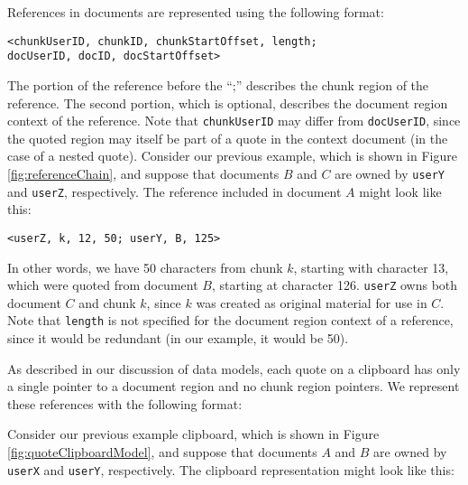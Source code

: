 \documentclass{acm_proc_article-sp}
\begin{document}
References in documents are represented using the following format:
\begin{center}
{\tt <chunkUserID, chunkID, chunkStartOffset, length;\\ 
docUserID, docID, docStartOffset>} 
\end{center}
The portion of the reference before the ``;'' describes the chunk region of the reference.  
The second portion, which is optional, describes the document region context of the reference.  
Note that {\tt chunkUserID} may differ from {\tt docUserID}, since the quoted region may itself be part of a quote in the context document (in the case of a nested quote).
Consider our previous example, which is shown in Figure \ref{fig:referenceChain}, and suppose that documents $B$ and  $C$ are owned by {\tt userY} and {\tt userZ}, respectively.
The reference included in document $A$ might look like this:
\begin{center}
{\tt <userZ, k, 12, 50; userY, B, 125>} 
\end{center}
In other words, we have 50 characters from chunk $k$, starting with character 13, which were quoted from document $B$, starting at character 126.
{\tt userZ} owns both document $C$ and chunk $k$, since $k$ was created as original material for use in $C$.
Note that {\tt length} is not specified for the document region context of a reference, since it would be redundant (in our example, it would be 50).


As described in our discussion of data models, each quote on a clipboard has only a single pointer to a document region and no chunk region pointers.
We represent these references with the following format:
\begin{center}
{\tt <docUserID, docID, startOffset, length>} 
\end{center}
Consider our previous example clipboard, which is shown in Figure \ref{fig:quoteClipboardModel}, and suppose that documents $A$ and  $B$ are owned by {\tt userX} and {\tt userY}, respectively.
The clipboard representation might look like this:
\begin{center}
{\tt <userX, A, 37, 75>}\\
{\tt <userY, B, 100, 50>}\\ 
\end{center}
\end{document}
